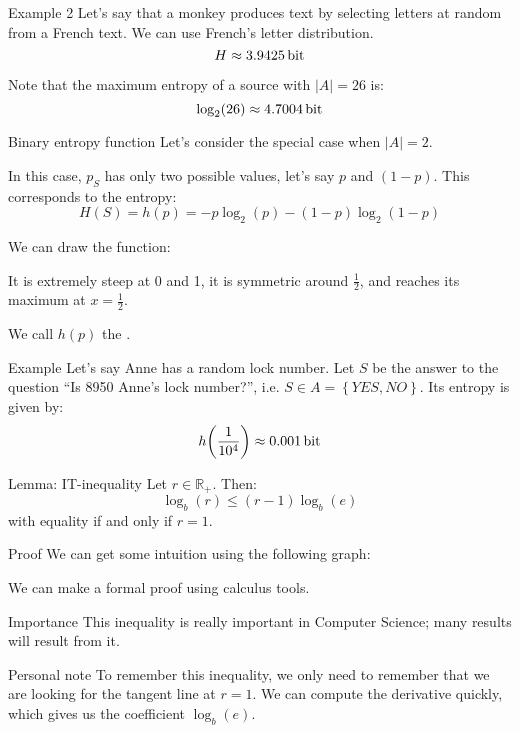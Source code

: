 \documentclass[a4paper]{article}
\begin{document}
\begin{parag}{Example 2}
    Let's say that a monkey produces text by selecting letters at random from a French text. We can use French's letter distribution. 
    \[H \approx \SI{3.9425}{\bit}\]
    
    Note that the maximum entropy of a source with $\left|A\right| = 26$ is: 
    \[\log_2\left(26\right) \approx \SI{4.7004}{\bit}\]
\end{parag}

\begin{parag}{Binary entropy function}
    Let's consider the special case when $\left|A\right| = 2$. 

    In this case, $p_S$ has only two possible values, let's say $p$ and $\left(1 - p\right)$. This corresponds to the entropy: 
    \[H\left(S\right) = h\left(p\right) = -p\log_2\left(p\right) - \left(1 - p\right) \log_2\left(1 - p\right)\]

    We can draw the function:

    It is extremely steep at 0 and 1, it is symmetric around $\frac{1}{2}$, and reaches its maximum at $x = \frac{1}{2}$.

    We call $h\left(p\right)$ the .
\end{parag}

\begin{parag}{Example}
    Let's say Anne has a random lock number. Let $S$ be the answer to the question ``Is 8950 Anne's lock number?'', i.e. $S \in A = \left\{YES, NO\right\}$. Its entropy is given by: 
    \[h\left(\frac{1}{10^4}\right) \approx \SI{0.001}{\bit}\]
\end{parag}

\begin{parag}{Lemma: IT-inequality}
    Let $r \in \mathbb{R}_+$. Then: 
    \[\log_b\left(r\right) \leq \left(r - 1\right) \log_b\left(e\right)\]
    with equality if and only if $r = 1$.
    
    \begin{subparag}{Proof}
        We can get some intuition using the following graph:

        We can make a formal proof using calculus tools.
    \end{subparag}

    \begin{subparag}{Importance}
        This inequality is really important in Computer Science; many results will result from it.
    \end{subparag}

    \begin{subparag}{Personal note}
        To remember this inequality, we only need to remember that we are looking for the tangent line at $r = 1$. We can compute the derivative quickly, which gives us the coefficient $\log_b\left(e\right)$.
    \end{subparag}
\end{parag}
\end{document}
